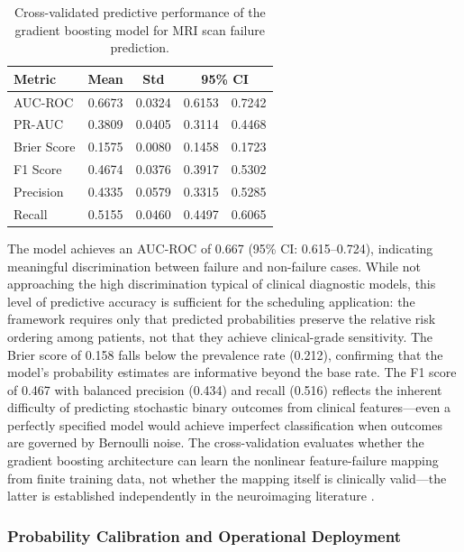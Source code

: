 \documentclass[11pt,a4paper]{article}
\begin{document}

\begin{table}[H]
\centering
\caption{Cross-validated predictive performance of the gradient boosting model for MRI scan failure prediction.}
\label{tab:ml_cv_metrics}
\begin{tabular}{lcccc}
\toprule
Metric & Mean & Std & \multicolumn{2}{c}{95\% CI} \\
\midrule
AUC-ROC & 0.6673 & 0.0324 & 0.6153 & 0.7242 \\
PR-AUC & 0.3809 & 0.0405 & 0.3114 & 0.4468 \\
Brier Score & 0.1575 & 0.0080 & 0.1458 & 0.1723 \\
F1 Score & 0.4674 & 0.0376 & 0.3917 & 0.5302 \\
Precision & 0.4335 & 0.0579 & 0.3315 & 0.5285 \\
Recall & 0.5155 & 0.0460 & 0.4497 & 0.6065 \\
\bottomrule
\end{tabular}
\end{table}

The model achieves an AUC-ROC of 0.667 (95\% CI: 0.615--0.724), indicating meaningful discrimination between failure and non-failure cases. While not approaching the high discrimination typical of clinical diagnostic models, this level of predictive accuracy is sufficient for the scheduling application: the framework requires only that predicted probabilities preserve the relative risk ordering among patients, not that they achieve clinical-grade sensitivity. The Brier score of 0.158 falls below the prevalence rate (0.212), confirming that the model's probability estimates are informative beyond the base rate. The F1 score of 0.467 with balanced precision (0.434) and recall (0.516) reflects the inherent difficulty of predicting stochastic binary outcomes from clinical features---even a perfectly specified model would achieve imperfect classification when outcomes are governed by Bernoulli noise. The cross-validation evaluates whether the gradient boosting architecture can learn the nonlinear feature-failure mapping from finite training data, not whether the mapping itself is clinically valid---the latter is established independently in the neuroimaging literature \citep{porembka2025disparities}.

\subsubsection{Probability Calibration and Operational Deployment}
\end{document}
